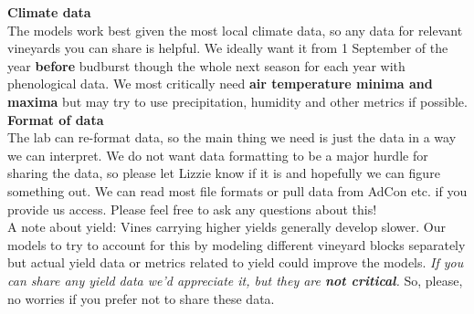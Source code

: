 \documentclass[11pt,letter]{article}
\begin{document}
{\bf Climate data}\\
The models work best given the most local climate data, so any data for relevant vineyards you can share is helpful. We ideally want it from 1 September of the year {\bf before} budburst though the whole next season for each year with phenological data. We most critically need {\bf air temperature minima and maxima} but may try to use precipitation, humidity and other metrics if possible.\\

{\bf Format of data}\\
The lab can re-format data, so the main thing we need is just the data in a way we can interpret. We do not want data formatting to be a major hurdle for sharing the data, so please let Lizzie know if it is and hopefully we can figure something out. We can read most file formats or pull data from AdCon etc. if you provide us access. Please feel free to ask any questions about this! \\

A note about yield: Vines carrying higher yields generally develop slower. Our models to try to account for this by modeling different vineyard blocks separately but actual yield data or metrics related to yield could improve the models. \emph{If you can share any yield data we'd appreciate it, but they are {\bf not critical}.} So, please, no worries if you prefer not to share these data.\\
\end{document}
